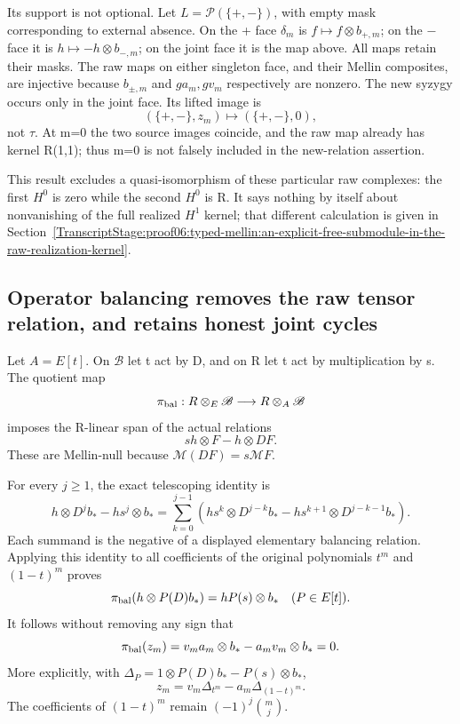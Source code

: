 Its support is not optional. Let \(L=\mathcal P(\{+,-\})\), with empty mask corresponding to external absence. On the + face \(\delta_m\) is \(f\mapsto f\otimes b_{+,m}\); on the \(-\) face it is \(h\mapsto-h\otimes b_{-,m}\); on the joint face it is the map above. All maps retain their masks. The raw maps on either singleton face, and their Mellin composites, are injective because \(b_{\pm,m}\) and \(ga_m,gv_m\) respectively are nonzero. The new syzygy occurs only in the joint face. Its lifted image is \[
(\{+,-\},z_m)\longmapsto(\{+,-\},0),
\] not \(\tau\). At m=0 the two source images coincide, and the raw map already has kernel R(1,1); thus m=0 is not falsely included in the new-relation assertion.

This result excludes a quasi-isomorphism of these particular raw complexes: the first \(H^0\) is zero while the second \(H^0\) is R. It says nothing by itself about nonvanishing of the full realized \(H^1\) kernel; that different calculation is given in Section~\ref{TranscriptStage:proof06:typed-mellin:an-explicit-free-submodule-in-the-raw-realization-kernel}.

\subsection{Operator balancing removes the raw tensor relation, and retains honest joint cycles}\label{TranscriptStage:proof06:typed-mellin:operator-balancing-removes-the-raw-tensor-relation-and-retains-honest-joint-cycles}

Let \(A=E[t]\). On \(\mathscr B\) let t act by D, and on R let t act by multiplication by s. The quotient map \[
\pi_{\rm bal}:R\otimes_E\mathscr B\longrightarrow R\otimes_A\mathscr B
\] imposes the R-linear span of the actual relations \[
sh\otimes F-h\otimes DF.
\] These are Mellin-null because \(\mathcal M(DF)=s\mathcal MF\).

For every \(j\ge1\), the exact telescoping identity is \[
h\otimes D^j b_*-hs^j\otimes b_*
=\sum_{k=0}^{j-1}
\left(hs^k\otimes D^{j-k}b_*
      -hs^{k+1}\otimes D^{j-k-1}b_*\right).
\] Each summand is the negative of a displayed elementary balancing relation. Applying this identity to all coefficients of the original polynomials \(t^m\) and \((1-t)^m\) proves \[
\pi_{\rm bal}(h\otimes P(D)b_*)=hP(s)\otimes b_*
\quad(P\in E[t]).
\] It follows without removing any sign that \[
\pi_{\rm bal}(z_m)
=v_ma_m\otimes b_*-a_mv_m\otimes b_*=0.
\] More explicitly, with \(\Delta_P=1\otimes P(D)b_*-P(s)\otimes b_*\), \[
z_m=v_m\Delta_{t^m}-a_m\Delta_{(1-t)^m}.
\] The coefficients of \((1-t)^m\) remain \((-1)^j\binom mj\).

